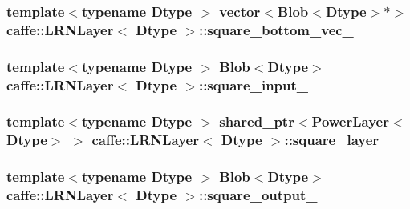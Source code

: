 \hypertarget{classcaffe_1_1_l_r_n_layer_a0361883b2eada25a56b5a90f5ff99cac}{
\subsubsection[{square\+\_\+bottom\+\_\+vec\+\_\+}]{\setlength{\rightskip}{0pt plus 5cm}template$<$typename Dtype $>$ vector$<${\bf Blob}$<$Dtype$>$$\ast$$>$ {\bf caffe\+::\+L\+R\+N\+Layer}$<$ Dtype $>$\+::square\+\_\+bottom\+\_\+vec\+\_\+\hspace{0.3cm}{\ttfamily [protected]}}}\label{classcaffe_1_1_l_r_n_layer_a0361883b2eada25a56b5a90f5ff99cac}
\hypertarget{classcaffe_1_1_l_r_n_layer_a750c4b6871af300f8de03b5eda197056}{
\subsubsection[{square\+\_\+input\+\_\+}]{\setlength{\rightskip}{0pt plus 5cm}template$<$typename Dtype $>$ {\bf Blob}$<$Dtype$>$ {\bf caffe\+::\+L\+R\+N\+Layer}$<$ Dtype $>$\+::square\+\_\+input\+\_\+\hspace{0.3cm}{\ttfamily [protected]}}}\label{classcaffe_1_1_l_r_n_layer_a750c4b6871af300f8de03b5eda197056}
\hypertarget{classcaffe_1_1_l_r_n_layer_a440a40fc6ec9131fd8425dabe8a48fa9}{
\subsubsection[{square\+\_\+layer\+\_\+}]{\setlength{\rightskip}{0pt plus 5cm}template$<$typename Dtype $>$ shared\+\_\+ptr$<${\bf Power\+Layer}$<$Dtype$>$ $>$ {\bf caffe\+::\+L\+R\+N\+Layer}$<$ Dtype $>$\+::square\+\_\+layer\+\_\+\hspace{0.3cm}{\ttfamily [protected]}}}\label{classcaffe_1_1_l_r_n_layer_a440a40fc6ec9131fd8425dabe8a48fa9}
\hypertarget{classcaffe_1_1_l_r_n_layer_a50c1f72f225f69d344857fc55dc52ef9}{
\subsubsection[{square\+\_\+output\+\_\+}]{\setlength{\rightskip}{0pt plus 5cm}template$<$typename Dtype $>$ {\bf Blob}$<$Dtype$>$ {\bf caffe\+::\+L\+R\+N\+Layer}$<$ Dtype $>$\+::square\+\_\+output\+\_\+\hspace{0.3cm}{\ttfamily [protected]}}}\label{classcaffe_1_1_l_r_n_layer_a50c1f72f225f69d344857fc55dc52ef9}
